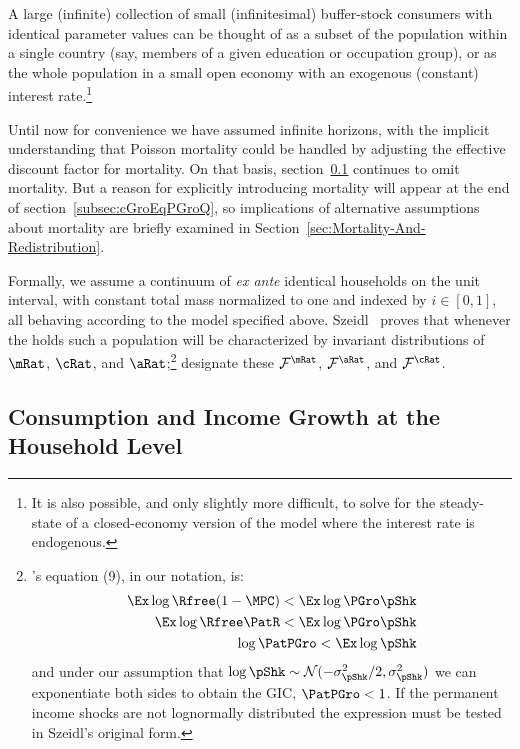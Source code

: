 \documentclass[BufferStockTheory]{subfiles}
\begin{document}
A large (infinite) collection of small (infinitesimal) buffer-stock consumers with identical parameter values can be thought of as a subset of the population within a single country (say, members of a given education or occupation group), or as the whole population in a small open economy with an exogenous (constant) interest rate.\footnote{It is also possible, and only slightly more difficult, to solve for the steady-state of a closed-economy version of the model where the interest rate is endogenous.}

Until now for convenience we have assumed infinite horizons, with the implicit understanding that Poisson mortality could be handled by adjusting the effective discount factor for mortality.  On that basis, section~\ref{subsec:cGroEqPGroIndQ} continues to omit mortality.  But a reason for explicitly introducing mortality will appear at the end of section~\ref{subsec:cGroEqPGroQ}, so implications of alternative assumptions about mortality are briefly examined in Section~\ref{sec:Mortality-And-Redistribution}.

Formally, we assume a continuum of \textit{ex ante} identical households on the unit interval, with constant total mass normalized to one and indexed by $i \in [0,1]$, all behaving according to the model specified above.  Szeidl~\citeyearpar{szeidlInvariant} proves that whenever the {\GIC} holds such a population will be characterized by invariant distributions of $\mRat$, $\cRat$, and $\aRat$;\footnote{\cite{szeidlInvariant}'s equation (9), in our notation, is:
  \begin{align*}
    \Ex \log \Rfree (1-\MPC) < \Ex \log \PGro \pShk
    \\  \Ex \log \Rfree \PatR    < \Ex \log \PGro \pShk
\\ \log \PatPGro < \Ex \log \pShk
  \end{align*}
  and under our assumption that $\log \pShk \sim \mathcal{N}(-\sigma^{2}_{\pShk}/2,\sigma^{2}_{\pShk})$ we can exponentiate both sides to obtain the GIC, $\PatPGro < 1$.  If the permanent income shocks are not lognormally distributed the expression must be tested in Szeidl's original form.
} designate these $\mathcal{F}^{\mRat}$, $\mathcal{F}^{\aRat}$, and $\mathcal{F}^{\cRat}$.%


\hypertarget{Consumption-and-Income-Growth-at-the-Household-Level}{}
\subsection{Consumption and Income Growth at the Household Level}\label{subsec:cGroEqPGroIndQ}
\end{document}

